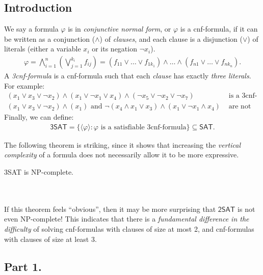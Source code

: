 \documentclass[10pt]{article}
\date{}
\begin{document}
		
\subsection*{Introduction}

\begin{definition}
	We say a formula \(\varphi\) is in \textit{conjunctive normal form}, or \(\varphi\) is a cnf-formula, if it can be written as a conjunction (\(\land\)) of \textit{clauses}, and each clause is a disjunction (\(\lor\)) of literals (either a variable \(x_i\) or its negation  \(\lnot x_i\)). 
\begin{align*}
	\varphi = \bigwedge_{i=1}^n\left(\bigvee_{j=1}^{k_i} f_{ij}\right) =  (f_{11} \lor \dots \lor f_{1k_1}) \land \dots \land (f_{n1} \lor \dots \lor f_{nk_n}).
\end{align*}
A \textit{3cnf-formula} is a cnf-formula such that each \textit{clause} has exactly \textit{three literals}.  For example:
\begin{align*}
	(x_1 \lor x_3 \lor \lnot x_2) \land (x_1 \lor \lnot x_1 \lor x_4) \land (\lnot x_5 \lor \lnot x_2 \lor \lnot x_7)& \text{ is a 3cnf-formula.}\\
	(x_1 \lor x_3 \lor \lnot x_2) \land (x_1)\text{ and }
	\lnot(x_4 \land x_1 \lor x_3) \land  (x_1 \lor \lnot x_1 \land x_4) & \text{ are not 3cnf-formulas.}
\end{align*}
Finally, we can define:
\begin{align*}
	\textsf{3SAT} = \{\langle\varphi\rangle: \varphi \text{ is a satisfiable 3cnf-formula}\} \subseteq \textsf{SAT}.
\end{align*}
\end{definition}
The following theorem is striking, since it shows that increasing the \textit{vertical complexity} of a formula does not necessarily allow it to be more expressive.\\

\begin{theorem}
	\textsf{3SAT} is NP-complete.
\end{theorem}
\\\\
If this theorem feels ``obvious'', then it may be more surprising that \(\textsf{2SAT}\) is not even NP-complete! This indicates that there is a \textit{fundamental difference in the difficulty} of solving cnf-formulas with clauses of size at most 2, and cnf-formulas with clauses of size at least 3. 
\subsection*{Part 1.}
\end{document}
